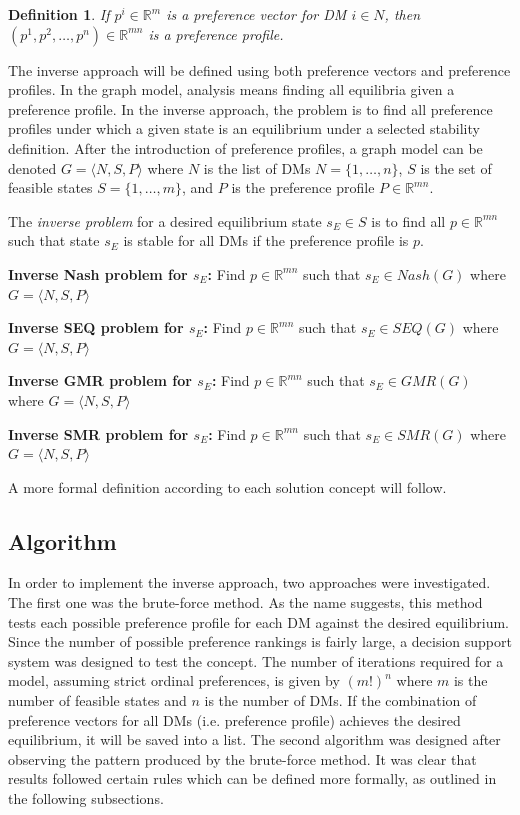 \documentclass[letterpaper,12pt,titlepage,oneside,final]{book}
\newtheorem{definition}[lemma]{Definition}
\begin{document}
\begin{definition}
\rm
If $p^i \in \mathbb{R}^m$ is a preference vector for DM $i \in N$, then $(p^1,p^2,\dots ,p^n) \in \mathbb{R}^{mn}$ is a preference profile.

\end{definition}


The inverse approach will be defined using both preference vectors and preference profiles. In the graph model, analysis means finding all equilibria given a preference profile. In the inverse approach, the problem is to find all preference profiles under which a given state is an equilibrium under a selected stability definition.  After the introduction of preference profiles, a graph model can be denoted $G=\langle N,S,P\rangle$ where $N$ is the list of DMs $N=\{1,\dots ,n\}$, $S$ is the set of feasible states $S=\{1,\dots ,m\}$, and $P$ is the preference profile $P \in \mathbb{R}^{mn}$.

The \emph{inverse problem} for a desired equilibrium state $s_E \in S$ is to find all $p \in \mathbb{R}^{mn}$ such that state $s_E$ is stable for all DMs if the preference profile is $p$.


\noindent \textbf{Inverse Nash problem for $s_E$:} Find $p \in \mathbb{R}^{mn}$ such that $s_E \in Nash(G)$ where $G=\langle N,S,P\rangle $

\noindent \textbf{Inverse SEQ problem for $s_E$:} Find $p \in \mathbb{R}^{mn}$ such that $s_E \in SEQ(G)$ where $G=\langle N,S,P\rangle $

\noindent \textbf{Inverse GMR problem for $s_E$:} Find $p \in \mathbb{R}^{mn}$ such that $s_E \in GMR(G)$ where $G=\langle N,S,P\rangle $

\noindent \textbf{Inverse SMR problem for $s_E$:} Find $p \in \mathbb{R}^{mn}$ such that $s_E \in SMR(G)$ where $G=\langle N,S,P\rangle $

A more formal definition according to each solution concept will follow.


\subsection{Algorithm}

In order to implement the inverse approach, two approaches were investigated. The first one was the brute-force method. As the name suggests, this method tests each possible preference profile for each DM against the desired equilibrium. Since the number of possible preference rankings is fairly large, a decision support system was designed to test the concept. The number of iterations required for a model, assuming strict ordinal preferences, is given by $(m!)^{n}$ where $m$ is the number of feasible states and $n$ is the number of DMs.  If the combination of preference vectors for all DMs (i.e. preference profile) achieves the desired equilibrium, it will be saved into a list. The second algorithm was designed after observing the pattern produced by the brute-force method. It was clear that results followed certain rules which can be defined more formally, as outlined in the following subsections. %
\end{document}
